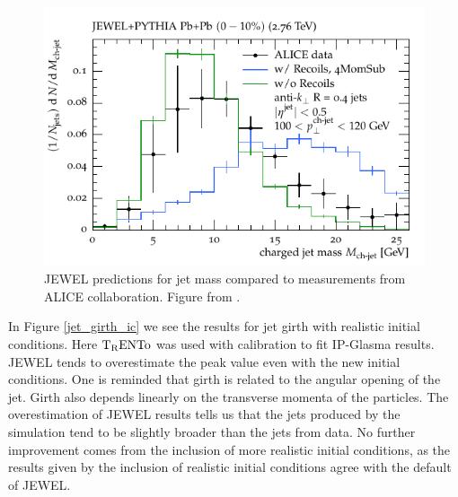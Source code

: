 \begin{figure}
\includegraphics[width=1.0\textwidth]{images/jewel_mass.png}
\caption[JEWEL prediction for mass.]{JEWEL predictions for jet mass compared to measurements from ALICE collaboration. Figure from \cite{elayavalli_medium_2017}.}
\label{jewel_mass}
\end{figure}

 \label{jewel_with_ic}

In Figure \ref{jet_girth_ic} we see the results for jet girth with realistic initial conditions. Here $\rm T_RENTo$ was used with calibration to fit IP-Glasma results\cite{moreland_alternative_2015}. JEWEL tends to overestimate the peak value even with the new initial conditions. One is reminded that girth is related to the angular opening of the jet. Girth also depends linearly on the transverse momenta of the particles. The overestimation of JEWEL results tells us that the jets produced by the simulation tend to be slightly broader than the jets from data. No further improvement comes from the inclusion of more realistic initial conditions, as the results given by the inclusion of realistic initial conditions agree with the default of JEWEL.


